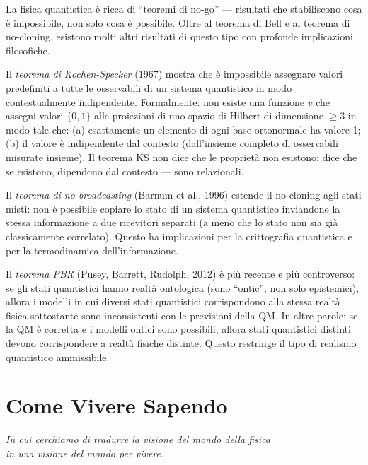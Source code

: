 \documentclass[11.5pt,a4paper,openany]{book}
\theoremstyle{remark}
\begin{document}
La fisica quantistica è ricca di ``teoremi di no-go'' --- risultati che stabiliscono cosa è impossibile, non solo cosa è possibile. Oltre al teorema di Bell e al teorema di no-cloning, esistono molti altri risultati di questo tipo con profonde implicazioni filosofiche.

Il \textit{teorema di Kochen-Specker} (1967) mostra che è impossibile assegnare valori predefiniti a tutte le osservabili di un sistema quantistico in modo contestualmente indipendente. Formalmente: non esiste una funzione $v$ che assegni valori $\{0, 1\}$ alle proiezioni di uno spazio di Hilbert di dimensione $\geq 3$ in modo tale che: (a) esattamente un elemento di ogni base ortonormale ha valore 1; (b) il valore è indipendente dal contesto (dall'insieme completo di osservabili misurate insieme). Il teorema KS non dice che le proprietà non esistono: dice che se esistono, dipendono dal contesto --- sono relazionali.

Il \textit{teorema di no-broadcasting} (Barnum et al., 1996) estende il no-cloning agli stati misti: non è possibile copiare lo stato di un sistema quantistico inviandone la stessa informazione a due ricevitori separati (a meno che lo stato non sia già classicamente correlato). Questo ha implicazioni per la crittografia quantistica e per la termodinamica dell'informazione.

Il \textit{teorema PBR} (Pusey, Barrett, Rudolph, 2012) è più recente e più controverso: se gli stati quantistici hanno realtà ontologica (sono ``ontic'', non solo epistemici), allora i modelli in cui diversi stati quantistici corrispondono alla stessa realtà fisica sottostante sono inconsistenti con le previsioni della QM. In altre parole: se la QM è corretta e i modelli ontici sono possibili, allora stati quantistici distinti devono corrispondere a realtà fisiche distinte. Questo restringe il tipo di realismo quantistico ammissibile.

\part{Come Vivere Sapendo}

\begin{center}\itshape
In cui cerchiamo di tradurre la visione del mondo della fisica\\
in una visione del mondo per vivere.
\end{center}
\clearpage
\end{document}
